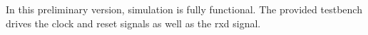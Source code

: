 In this preliminary version, simulation is fully functional. The provided
testbench drives the clock and reset signals as well as the rxd signal.

